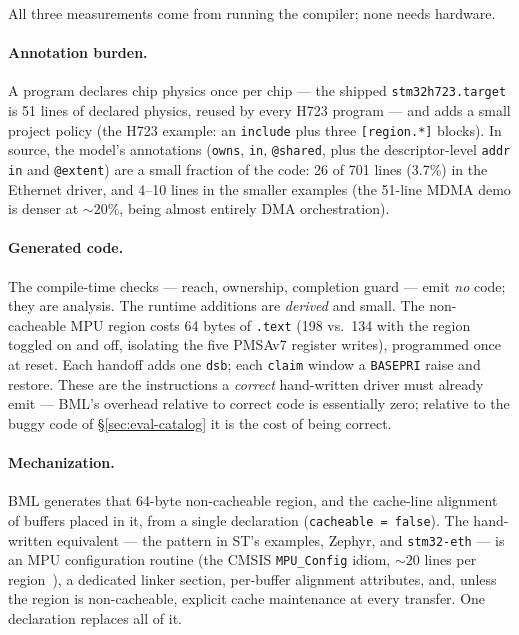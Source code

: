 \documentclass[10pt,twocolumn]{article}
\begin{document}
All three measurements come from running the compiler; none needs hardware.

\paragraph{Annotation burden.} A program declares chip physics once per chip ---
the shipped \texttt{stm32h723.target} is 51 lines of declared physics, reused by
every H723 program --- and adds a small project policy (the H723 example: an
\texttt{include} plus three \texttt{[region.*]} blocks). In source, the model's
annotations
(\texttt{owns}, \texttt{in}, \texttt{@shared}, plus the descriptor-level
\texttt{addr in} and \texttt{@extent}) are a small fraction of the code: 26 of 701 lines (3.7\%) in the Ethernet driver,
and 4--10 lines in the smaller examples (the 51-line MDMA demo is denser at
${\sim}20\%$, being almost entirely DMA orchestration).

\paragraph{Generated code.} The compile-time checks --- reach, ownership,
completion guard --- emit \emph{no} code; they are analysis. The runtime additions
are \emph{derived} and small. The non-cacheable MPU region costs 64 bytes of
\texttt{.text} (198 vs.\ 134 with the region toggled on and off, isolating the
five PMSAv7 register writes), programmed once at reset. Each handoff adds one
\texttt{dsb}; each \texttt{claim} window a \texttt{BASEPRI} raise and restore.
These are the instructions a \emph{correct} hand-written driver must already emit
--- BML's overhead relative to correct code is essentially zero; relative to the
buggy code of \S\ref{sec:eval-catalog} it is the cost of being correct.

\paragraph{Mechanization.} BML generates that 64-byte non-cacheable region, and
the cache-line alignment of buffers placed in it, from a single declaration
(\texttt{cacheable = false}). The hand-written equivalent --- the pattern in ST's
examples, Zephyr, and \texttt{stm32-eth} --- is an MPU configuration routine (the
CMSIS \texttt{MPU\_Config} idiom, ${\sim}20$ lines per region~\cite{an4839}), a
dedicated linker section, per-buffer alignment attributes, and, unless the region
is non-cacheable, explicit cache maintenance at every transfer. One declaration
replaces all of it.
\end{document}
